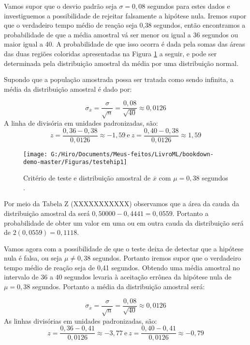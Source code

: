 \documentclass[
  openany]{book}
\begin{document}
Vamos supor que o desvio padrão seja \(\sigma=0,08\) segundos para estes dados e investiguemos a possibilidade de rejeitar falsamente a hipótese nula. Iremos supor que o verdadeiro tempo médio de reação seja 0,38 segundos, então encontramos a probabilidade de que a média amostral vá ser menor ou igual a 36 segundos ou maior igual a 40. A probabilidade de que isso ocorra é dada pela somas das áreas das duas regiões coloridas apresentadas na Figura \ref{fig:testehip1} a seguir, e pode ser determinada pela distribuição amostral da média por uma distribuição normal.

Supondo que a população amostrada possa ser tratada como sendo infinita, a média da distribuição amostral é dado por:

\[\sigma_{\overline{x}}=\frac{\sigma}{\sqrt{n}}=\frac{0,08}{\sqrt{40}}\approx 0,0126\]
A linha de divisória em unidades padronizadas, são:
\[z=\frac{0,36-0,38}{0,0126}\approx -1,59 \ \mbox{e} \ z=\frac{0,40-0,38}{0,0126}\approx 1,59\]

\begin{figure}

{\centering \texttt{[image: G:/Hiro/Documents/Meus-feitos/LivroML/bookdown-demo-master/Figuras/testehip1]} 

}

\caption{Critério de teste e distribuição amostral de \(\overline{x}\) com \(\mu =0,38\) segundos \citep{freund2009estatistica}.}\label{fig:testehip1}
\end{figure}



Por meio da Tabela Z (XXXXXXXXXXX) observamos que a área da cauda da distribuição amostral da será \(0,50000-0,4441=0,0559\). Portanto a probabilidade de obter um valor em uma ou em outra cauda da distribuição será de \(2(0,0559)=0,1118\).

Vamos agora com a possibilidade de que o teste deixa de detectar que a hipótese nula é falsa, ou seja \(\mu \neq 0,38\) segundos. Portanto iremos supor que o verdadeiro tempo médio de reação seja de 0,41 segundos. Obtendo uma média amostral no intervalo de 36 a 40 segundos levaria à aceitação errônea da hipótese nula de \(\mu=0,38\) segundos. Portanto a média da distribuição amostral será:

\[\sigma_{\overline{x}}=\frac{\sigma}{\sqrt{n}}=\frac{0,08}{\sqrt{40}}\approx 0,0126\]
As linhas divisórias em unidades padronizadas, são:
\[z=\frac{0,36-0,41}{0,0126}\approx -3,77 \ \mbox{e} \ z=\frac{0,40-0,41}{0,0126}\approx -0,79\]
\end{document}
